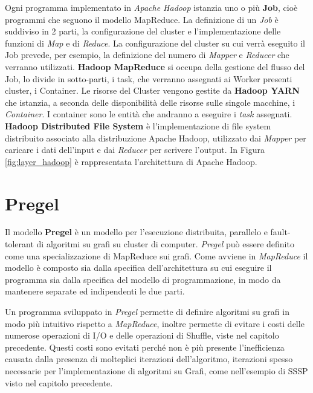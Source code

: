 \documentclass[LaM,binding=0.6cm]{sapthesis}
\begin{document}
Ogni programma implementato in \textit{Apache Hadoop} istanzia uno o più \textbf{Job}, cioè programmi che seguono il modello MapReduce. La definizione di un \textit{Job} è suddiviso in 2 parti, la configurazione del cluster e l'implementazione delle funzioni di \textit{Map} e di \textit{Reduce}. 
La configurazione del cluster su cui verrà eseguito il Job prevede, per esempio, la definizione del numero di \textit{Mapper} e \textit{Reducer} che verranno utilizzati. 
\textbf{Hadoop MapReduce} si occupa della gestione del flusso del Job, lo divide in sotto-parti, i task, che verranno assegnati ai Worker presenti cluster, i Container.
Le risorse del Cluster vengono gestite da \textbf{Hadoop YARN} che istanzia, a seconda delle disponibilità delle risorse sulle singole macchine, i \textit{Container}. I container sono le entità che andranno a eseguire i \textit{task} assegnati.
\textbf{Hadoop Distributed File System} è l'implementazione di file system distribuito associato alla distribuzione Apache Hadoop, utilizzato dai \textit{Mapper} per caricare i dati dell'input e dai \textit{Reducer} per scrivere l'output. In Figura \ref{fig:layer_hadoop} è rappresentata l'architettura di Apache Hadoop.



\chapter{Pregel}

Il modello \textbf{Pregel} \cite{Malewicz:2010:PSL:1807167.1807184}  è  un modello per l'esecuzione distribuita, parallelo e fault-tolerant di algoritmi su grafi su cluster di computer.
\textit{Pregel} può essere definito come una specializzazione di MapReduce \cite{Dean:2008:MSD:1327452.1327492} sui grafi.
Come avviene in \textit{MapReduce} il modello è composto sia dalla specifica dell'architettura su cui eseguire il programma sia dalla specifica del modello di programmazione, in modo da mantenere separate ed indipendenti le due parti. 


Un programma  sviluppato in \textit{Pregel} permette di definire algoritmi su grafi in modo più intuitivo rispetto a \textit{MapReduce}, inoltre permette di evitare i costi delle numerose operazioni di I/O e delle operazioni di Shuffle, viste nel capitolo precedente. Questi costi sono evitati perché non è più presente l'inefficienza causata dalla presenza di molteplici iterazioni dell'algoritmo, iterazioni spesso necessarie per l'implementazione di algoritmi su Grafi, come nell'esempio di SSSP visto nel capitolo precedente. 
\end{document}
